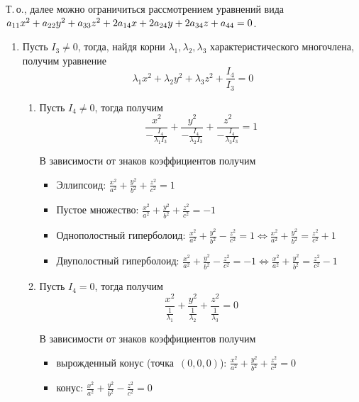 Т.\,о., далее можно ограничиться рассмотрением уравнений вида $a_{11} x^2 + a_{22} y^2 + a_{33} z^2 + 2 a_{14} x + 2 a_{24} y + 2 a_{34} z \opbr+ a_{44} = 0$.
\begin{enumerate}
	\item Пусть $I_3 \neq 0$, тогда, найдя корни $\lambda_1, \lambda_2, \lambda_3$ характеристического многочлена, получим уравнение
	\begin{equation*}
	\lambda_1 x^2 + \lambda_2 y^2 + \lambda_3 z^2 + \frac{I_4}{I_3} = 0
	\end{equation*}
	\begin{enumerate}
		\item Пусть $I_4 \neq 0$, тогда получим
		\begin{equation*}
		\frac{x^2}{-\frac{I_4}{\lambda_1 I_3}} + \frac{y^2}{-\frac{I_4}{\lambda_2 I_3}} + \frac{z^2}{-\frac{I_4}{\lambda_3 I_3}} = 1
		\end{equation*}
		
		В зависимости от знаков коэффициентов получим
		\begin{itemize}
			\item Эллипсоид:
			$\displaystyle \frac{x^2}{a^2} + \frac{y^2}{b^2} + \frac{z^2}{c^2} = 1$
			\item Пустое множество:
			$\displaystyle \frac{x^2}{a^2} + \frac{y^2}{b^2} + \frac{z^2}{c^2} = -1$
			\item Однополостный гиперболоид:
			$\displaystyle \frac{x^2}{a^2} + \frac{y^2}{b^2} - \frac{z^2}{c^2} = 1 \Leftrightarrow
			\frac{x^2}{a^2} + \frac{y^2}{b^2} = \frac{z^2}{c^2} + 1$
			\item Двуполостный гиперболоид:
			$\displaystyle \frac{x^2}{a^2} + \frac{y^2}{b^2} - \frac{z^2}{c^2} = -1 \Leftrightarrow
			\frac{x^2}{a^2} + \frac{y^2}{b^2} = \frac{z^2}{c^2} - 1$
		\end{itemize}
		
		\item Пусть $I_4 = 0$, тогда получим
		\begin{equation*}
		\frac{x^2}{\frac1{\lambda_1}} + \frac{y^2}{\frac1{\lambda_2}} + \frac{z^2}{\frac1{\lambda_3}} = 0
		\end{equation*}
		
		В зависимости от знаков коэффициентов получим
		\begin{itemize}
			\item вырожденный конус (точка~$(0, 0, 0)$):
			$\displaystyle \frac{x^2}{a^2} + \frac{y^2}{b^2} + \frac{z^2}{c^2} = 0$
			\item конус:
			$\displaystyle \frac{x^2}{a^2} + \frac{y^2}{b^2} - \frac{z^2}{c^2} = 0$
		\end{itemize}
	\end{enumerate}
	

\end{enumerate}

